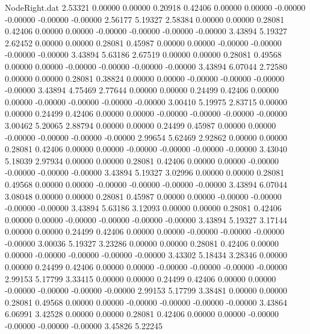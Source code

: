 \begin{filecontents}{NodeRight.dat}
   2.53321    0.00000    0.00000     0.20918    0.42406    0.00000    0.00000   -0.00000   -0.00000   -0.00000   -0.00000    2.56177    5.19327
   2.58384    0.00000    0.00000     0.28081    0.42406    0.00000    0.00000   -0.00000   -0.00000   -0.00000   -0.00000    3.43894    5.19327
   2.62452    0.00000    0.00000     0.28081    0.45987    0.00000    0.00000   -0.00000   -0.00000   -0.00000   -0.00000    3.43894    5.63186
   2.67519    0.00000    0.00000     0.28081    0.49568    0.00000    0.00000   -0.00000   -0.00000   -0.00000   -0.00000    3.43894    6.07044
   2.72580    0.00000    0.00000     0.28081    0.38824    0.00000    0.00000   -0.00000   -0.00000   -0.00000   -0.00000    3.43894    4.75469
   2.77644    0.00000    0.00000     0.24499    0.42406    0.00000    0.00000   -0.00000   -0.00000   -0.00000   -0.00000    3.00410    5.19975
   2.83715    0.00000    0.00000     0.24499    0.42406    0.00000    0.00000   -0.00000   -0.00000   -0.00000   -0.00000    3.00462    5.20065
   2.88794    0.00000    0.00000     0.24499    0.45987    0.00000    0.00000   -0.00000   -0.00000   -0.00000   -0.00000    2.99654    5.62469
   2.92862    0.00000    0.00000     0.28081    0.42406    0.00000    0.00000   -0.00000   -0.00000   -0.00000   -0.00000    3.43040    5.18039
   2.97934    0.00000    0.00000     0.28081    0.42406    0.00000    0.00000   -0.00000   -0.00000   -0.00000   -0.00000    3.43894    5.19327
   3.02996    0.00000    0.00000     0.28081    0.49568    0.00000    0.00000   -0.00000   -0.00000   -0.00000   -0.00000    3.43894    6.07044
   3.08048    0.00000    0.00000     0.28081    0.45987    0.00000    0.00000   -0.00000   -0.00000   -0.00000   -0.00000    3.43894    5.63186
   3.12093    0.00000    0.00000     0.28081    0.42406    0.00000    0.00000   -0.00000   -0.00000   -0.00000   -0.00000    3.43894    5.19327
   3.17144    0.00000    0.00000     0.24499    0.42406    0.00000    0.00000   -0.00000   -0.00000   -0.00000   -0.00000    3.00036    5.19327
   3.23286    0.00000    0.00000     0.28081    0.42406    0.00000    0.00000   -0.00000   -0.00000   -0.00000   -0.00000    3.43302    5.18434
   3.28346    0.00000    0.00000     0.24499    0.42406    0.00000    0.00000   -0.00000   -0.00000   -0.00000   -0.00000    2.99153    5.17799
   3.33415    0.00000    0.00000     0.24499    0.42406    0.00000    0.00000   -0.00000   -0.00000   -0.00000   -0.00000    2.99153    5.17799
   3.38481    0.00000    0.00000     0.28081    0.49568    0.00000    0.00000   -0.00000   -0.00000   -0.00000   -0.00000    3.43864    6.06991
   3.42528    0.00000    0.00000     0.28081    0.42406    0.00000    0.00000   -0.00000   -0.00000   -0.00000   -0.00000    3.45826    5.22245

\end{filecontents}
